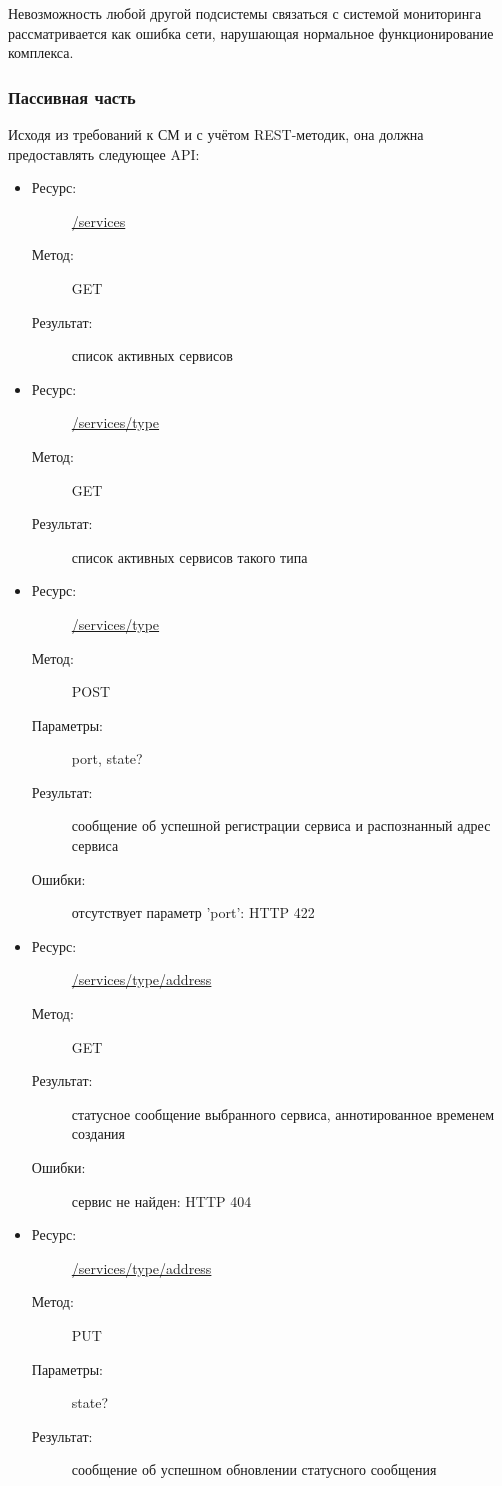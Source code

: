 \documentclass[a4paper,12pt]{report}
\numberwithin{equation}{section}
\begin{document}
Невозможность любой другой подсистемы связаться с системой мониторинга рассматривается
как ошибка сети, нарушающая нормальное функционирование комплекса.

\subsubsection{Пассивная часть}
Исходя из требований к СМ и с учётом REST-методик, она должна предоставлять следующее API:

\begin{itemize}
  \item
  \begin{description}
    \item[Ресурс:] \url{/services}
    \item[Метод:] GET
    \item[Результат:] список активных сервисов
  \end{description}
  \item
  \begin{description}
    \item[Ресурс:] \url{/services/type}
    \item[Метод:] GET
    \item[Результат:] список активных сервисов такого типа
  \end{description}
  \item
  \begin{description}
    \item[Ресурс:] \url{/services/type}
    \item[Метод:] POST
    \item[Параметры:] port, state?
    \item[Результат:] сообщение об успешной регистрации сервиса и распознанный адрес сервиса
    \item[Ошибки:] отсутствует параметр 'port': HTTP 422
  \end{description}
  \item
  \begin{description}
    \item[Ресурс:] \url{/services/type/address}
    \item[Метод:] GET
    \item[Результат:] статусное сообщение выбранного сервиса, аннотированное временем создания
    \item[Ошибки:] сервис не найден: HTTP 404
  \end{description}
  \item
  \begin{description}
    \item[Ресурс:] \url{/services/type/address}
    \item[Метод:] PUT
    \item[Параметры:] state?
    \item[Результат:] сообщение об успешном обновлении статусного сообщения
  \end{description}
\end{itemize}
\end{document}
